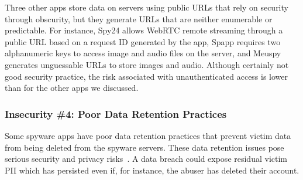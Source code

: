 
Three other apps store data on servers using public URLs that rely on
security through obscurity, but they generate URLs that are neither
enumerable or predictable.  For instance, Spy24 allows WebRTC remote
streaming through a public URL based on a request ID generated by the
app, Spapp requires two alphanumeric keys to access image and audio
files on the server, and Meuspy generates unguessable URLs to
store images and audio.  Although certainly not good security
practice, the risk associated with unauthenticated access is lower
than for the other apps we discussed.





\subsubsection*{Insecurity \#4: Poor Data Retention Practices}


Some spyware apps have poor data retention practices that prevent
victim data from being deleted from the spyware servers. These data retention issues pose serious security and privacy risks~\cite{santhanam2022scraping}. A data breach could expose residual victim PII which has persisted even if, for instance, the abuser has deleted their account.

